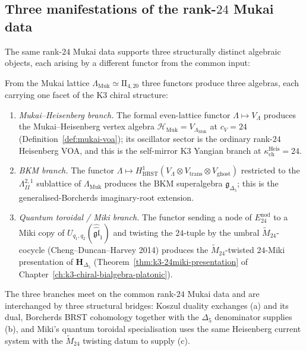 \subsection{Three manifestations of the rank-\texorpdfstring{$24$}{24} Mukai data}
\label{subsec:three-manifestations-mukai-rank24}

The same rank-$24$ Mukai data supports three structurally distinct
algebraic objects, each arising by a different functor from the common
input:

\begin{theorem}
\label{thm:three-branches-mukai}
From the Mukai lattice $\Lambda_{\mathrm{Muk}}\simeq\mathrm{II}_{4,20}$ three
functors produce three algebras, each carrying one facet of the K3 chiral
structure:
\begin{enumerate}[label=\textup{(\alph*)}]
\item \emph{Mukai--Heisenberg branch.} The formal even-lattice functor
 $\Lambda\mapsto V_\Lambda$ produces the Mukai--Heisenberg vertex algebra
 $\mathcal{H}_{\mathrm{Muk}} = V_{\Lambda_{\mathrm{Muk}}}$ at $c_V = 24$
 (Definition~\ref{def:mukai-voa}); its oscillator sector is the ordinary
 rank-$24$ Heisenberg VOA, and this is the self-mirror K3 Yangian branch at
 $\kappa_{\mathrm{ch}}^{\mathrm{Heis}} = 24$.
\item \emph{BKM branch.} The functor $\Lambda\mapsto H^1_{\mathrm{BRST}}
 (V_\Lambda\otimes V_{\mathrm{trans}}\otimes V_{\mathrm{ghost}})$ restricted
 to the $\Lambda^{2,1}_{II}$ sublattice of $\Lambda_{\mathrm{Muk}}$ produces the
 BKM superalgebra $\mathfrak{g}_{\Delta_5}$; this is the generalised-Borcherds
 imaginary-root extension.
\item \emph{Quantum toroidal / Miki branch.} The functor sending a node of
 $E^{\mathrm{nod}}_{24}$ to a Miki copy of
 $U_{q_1,q_2}(\widehat{\widehat{\mathfrak{gl}}}_1)$ and twisting the
 $24$-tuple by the umbral $\widetilde{M}_{24}$-cocycle (Cheng--Duncan--Harvey 2014)
 produces the $\widetilde{M}_{24}$-twisted $24$-Miki presentation of
 $\mathbf{H}_{\Delta_5}$ (Theorem~\ref{thm:k3-24miki-presentation} of
 Chapter~\ref{ch:k3-chiral-bialgebra-platonic}).
\end{enumerate}
The three branches meet on the common rank-$24$ Mukai data and are
interchanged by three structural bridges: Koszul duality exchanges (a)
and its dual, Borcherds BRST cohomology together with the $\Delta_5$
denominator supplies (b), and Miki's quantum toroidal specialisation uses
the same Heisenberg current system with the $\widetilde M_{24}$ twisting
datum to supply (c).
\end{theorem}

